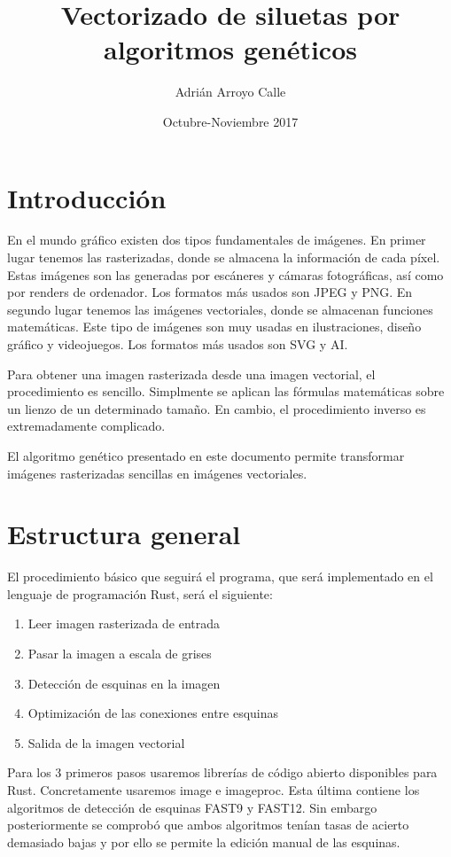 \documentclass{report}
\title{Vectorizado de siluetas por algoritmos genéticos}
\author{Adrián Arroyo Calle}
\date{ Octubre-Noviembre 2017}
\begin{document}
\maketitle

\chapter{Introducción}
En el mundo gráfico existen dos tipos fundamentales de imágenes. En primer lugar tenemos las rasterizadas, donde se almacena la información de cada píxel. Estas imágenes son las generadas por escáneres y cámaras fotográficas, así como por renders de ordenador. Los formatos más usados son JPEG y PNG. En segundo lugar tenemos las imágenes vectoriales, donde se almacenan funciones matemáticas. Este tipo de imágenes son muy usadas en ilustraciones, diseño gráfico y videojuegos. Los formatos más usados son SVG y AI. 

Para obtener una imagen rasterizada desde una imagen vectorial, el procedimiento es sencillo. Simplmente se aplican las fórmulas matemáticas sobre un lienzo de un determinado tamaño. En cambio, el procedimiento inverso es extremadamente complicado. 

El algoritmo genético presentado en este documento permite transformar imágenes rasterizadas sencillas en imágenes vectoriales.

\chapter{Estructura general}

El procedimiento básico que seguirá el programa, que será implementado en el lenguaje 
de programación Rust\cite{Matsakis:2014:RL:2692956.2663188}, será el siguiente:

\begin{enumerate}
	\item Leer imagen rasterizada de entrada
	\item Pasar la imagen a escala de grises
	\item Detección de esquinas en la imagen
	\item Optimización de las conexiones entre esquinas
	\item Salida de la imagen vectorial
\end{enumerate}

Para los 3 primeros pasos usaremos librerías de código abierto disponibles para Rust. Concretamente
usaremos image e imageproc. Esta última contiene los algoritmos de detección de esquinas FAST9 y 
FAST12. Sin embargo posteriormente se comprobó que ambos algoritmos tenían tasas de acierto
demasiado bajas y por ello se permite la edición manual de las esquinas.
\end{document}
